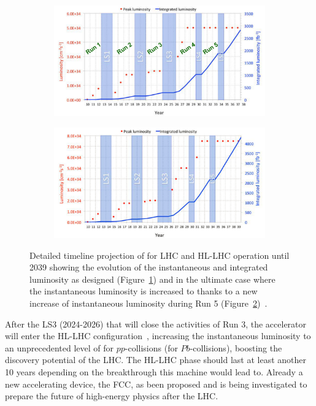 	\begin{figure}[H]
		\begin{subfigure}{\linewidth}
			\centering
			\includegraphics[width=\plotwidth]{fig/chapt3/HL-LHC-nominal.png}\\
			\caption{\label{fig:HL-LHC-Timeline:A}}
		\end{subfigure}
		\begin{subfigure}{\linewidth}
			\centering
			\includegraphics[width=\plotwidth]{fig/chapt3/HL-LHC-ultimate.png}
			\caption{\label{fig:HL-LHC-Timeline:B}}
		\end{subfigure}
		\caption{\label{fig:HL-LHC-Timeline} Detailed timeline projection of for LHC and HL-LHC operation until 2039 showing the evolution of the instantaneous and integrated luminosity as designed (Figure~\ref{fig:HL-LHC-Timeline:A}) and in the ultimate case where the instantaneous luminosity is increased to \siflux thanks to a new increase of instantaneous luminosity during Run 5 (Figure~\ref{fig:HL-LHC-Timeline:B})~\cite{HLLHC2017,HLLHCPDR}.}
	\end{figure}
	
	After the \acl{LS3} (2024-2026) that will close the activities of Run 3, the accelerator will enter the HL-LHC configuration~\cite{HLLHC2017}, increasing the instantaneous luminosity to an unprecedented level of \siflux for $pp$-collisions (\siflux for $Pb$-collisions), boosting the discovery potential of the LHC. The HL-LHC phase should last at least another 10 years depending on the breakthrough this machine would lead to. Already a new accelerating device, the FCC, as been proposed and is being investigated to prepare the future of high-energy physics after the LHC.
	
